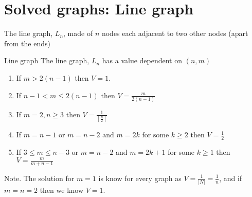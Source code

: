 \documentclass[11pt]{beamer}
\newcommand{\ceil}[1]{\left \lceil #1 \right \rceil}
\begin{document}
\section[]{Solved graphs: Line graph}
\hypertarget{Solved graphs: Line graph}{}
\begin{frame}{\insertsection}

The line graph, $L_{n}$, made of $n$ nodes each adjacent to two other nodes (apart from the ends)

\begin{block}{Line graph}
The line graph, $L_{n}$ has a value dependent on $(n,m)$
\begin{enumerate}
\item If $m > 2(n-1)$ then $V=1$.
\item If $n-1 < m \leq 2(n-1)$ then $V=\frac{m}{2(n-1)}$
\item If $m=2 , n\geq 3$ then $V=\frac{1}{\ceil{\frac{n}{2}}}$
\item If $m=n-1 \text{ or } m=n-2  \text{ and } m=2k \text{ for some } k \geq 2 $ then $V=\frac{1}{2}$
\item If $3 \leq m \leq n-3$ or  $m=n-2$ and $m=2k+1$ for some  $k \geq 1$ then $V=\frac{m}{m+n-1}$
\end{enumerate}
\end{block}
Note. The solution for $m=1$ is know for every graph as $V=\frac{1}{|N|}=\frac{1}{n}$, and if $m=n=2$ then we know $V=1$.
\end{frame}
\end{document}
